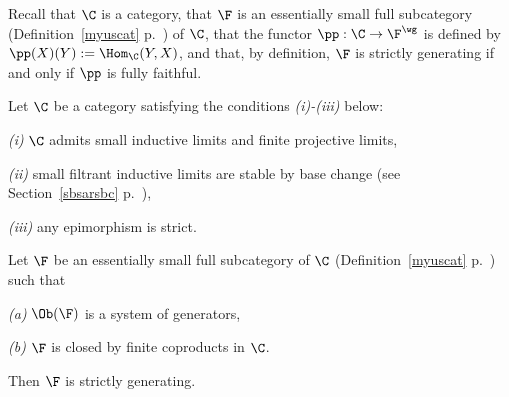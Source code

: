 \documentclass[12pt]{article}
\theoremstyle{remark}
\theoremstyle{definition}
\begin{document}



Recall that $\C$ is a category, that $\F$ is an essentially small full subcategory (Definition~\ref{myuscat} p.~) of $\C$, that the functor $\pp:\C\to\F^\wg$ is defined by $\pp(X)(Y):=\Hom_\C(Y,X)$, and that, by definition, $\F$ is strictly generating if and only if $\pp$ is fully faithful.

\begin{thm}[Theorem 5.3.6 p.~124] 
Let $\C$ be a category satisfying the conditions \emph{(i)-(iii)} below:

\nn\emph{(i)} $\C$ admits small inductive limits and finite projective limits, 

\nn\emph{(ii)} small filtrant inductive limits are stable by base change (see Section~\ref{sbsarsbc} p.~), 

\nn\emph{(iii)} any epimorphism is strict. 

\nn Let $\F$ be an essentially small full subcategory of $\C$ (Definition~\ref{myuscat} p.~) such that 

\nn\emph{(a)} $\Ob(\F)$ is a system of generators,

\nn\emph{(b)} $\F$ is closed by finite coproducts in $\C$. 

\nn Then $\F$ is strictly generating.
\end{thm}
\end{document}
